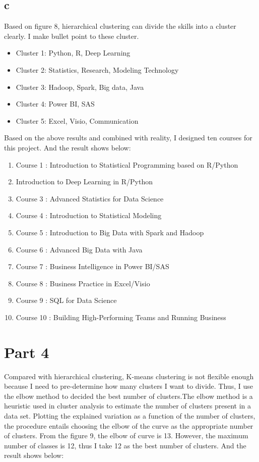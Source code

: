 \documentclass[10pt,onecolumn,letterpaper]{article}
\begin{document}
\subsection*{c}
Based on figure 8, hierarchical clustering can divide the skills into a cluster clearly. I make bullet point to these cluster. 

\begin{itemize}
  \item Cluster 1: Python, R, Deep Learning
  \item Cluster 2: Statistics, Research, Modeling Technology
  \item Cluster 3: Hadoop, Spark, Big data, Java
  \item Cluster 4: Power BI, SAS
  \item Cluster 5: Excel, Visio, Communication
\end{itemize}

\noindent Based on the above results and combined with reality, I designed ten courses for this project. And the result shows below:

\begin{enumerate}
  \item Course 1 : Introduction to Statistical Programming based on R/Python
  \item Introduction to Deep Learning in R/Python
  \item Course 3 : Advanced Statistics for Data Science
  \item Course 4 : Introduction to Statistical Modeling
  \item Course 5 : Introduction to Big Data with Spark and Hadoop
  \item Course 6 : Advanced Big Data with Java
  \item Course 7 : Business Intelligence in Power BI/SAS
  \item Course 8 : Business Practice in Excel/Visio
  \item Course 9 : SQL for Data Science
  \item Course 10 : Building High-Performing Teams and Running Business
\end{enumerate}

\section*{Part 4}
Compared with hierarchical clustering, K-means clustering is not flexible enough because I need to pre-determine how many clusters I want to divide. Thus, I use the elbow method to decided the best number of clusters.The elbow method is a heuristic used in cluster analysis to estimate the number of clusters present in a data set. Plotting the explained variation as a function of the number of clusters, the procedure entails choosing the elbow of the curve as the appropriate number of clusters. From the figure 9, the elbow of curve is 13. However, the maximum number of classes is 12, thus I take 12 as the best number of clusters. And the result shows below:
\end{document}
